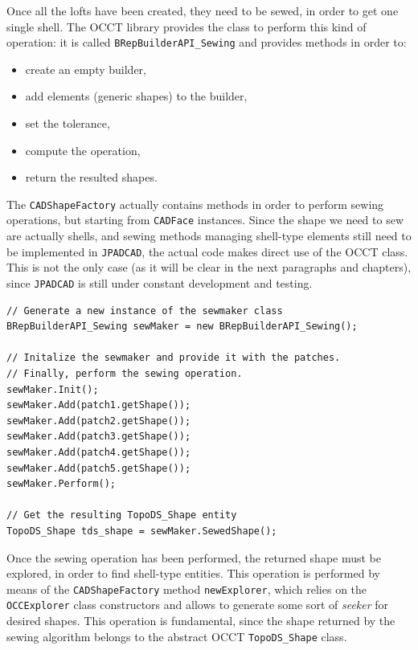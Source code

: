 \bigskip
\noindent
Once all the lofts have been created, they need to be sewed, in order to get one single shell. The \gls{OCCT} library provides the class to perform this kind of operation: it is called \lstinline[language=Java]!BRepBuilderAPI_Sewing! and provides methods in order to:
%
\begin{itemize}
\item create an empty builder,
\item add elements (generic shapes) to the builder,
\item set the tolerance,
\item compute the operation,
\item return the resulted shapes. 
\end{itemize}
%
The \lstinline[language=Java]!CADShapeFactory! actually contains methods in order to perform sewing operations, but starting from \lstinline[language=Java]!CADFace! instances. Since the shape we need to sew are actually shells, and sewing methods managing shell-type elements still need to be implemented in \lstinline[language=Java]!JPADCAD!, the actual code makes direct use of the \gls{OCCT} class. This is not the only case (as it will be clear in the next paragraphs and chapters), since \lstinline[language=Java]!JPADCAD! is still under constant development and testing. 
%
\bigskip
\begin{lstlisting}[caption={Lofts sewing process}, captionpos=b, tabsize=2, label={lst:PatchSewing}]
// Generate a new instance of the sewmaker class
BRepBuilderAPI_Sewing sewMaker = new BRepBuilderAPI_Sewing();

// Initalize the sewmaker and provide it with the patches.
// Finally, perform the sewing operation. 
sewMaker.Init();
sewMaker.Add(patch1.getShape());
sewMaker.Add(patch2.getShape());
sewMaker.Add(patch3.getShape());
sewMaker.Add(patch4.getShape());
sewMaker.Add(patch5.getShape());
sewMaker.Perform();

// Get the resulting TopoDS_Shape entity
TopoDS_Shape tds_shape = sewMaker.SewedShape();
\end{lstlisting}

\bigskip
\noindent
Once the sewing operation has been performed, the returned shape must be explored, in order to find shell-type entities. This operation is performed by means of the \lstinline[language=Java]!CADShapeFactory! method \lstinline[language=Java]!newExplorer!, which relies on the \lstinline[language=Java]!OCCExplorer! class constructors and allows to generate some sort of \emph{seeker} for desired shapes. This operation is fundamental, since the shape returned by the sewing algorithm belongs to the abstract \gls{OCCT} \lstinline[language=Java]!TopoDS_Shape! class.

